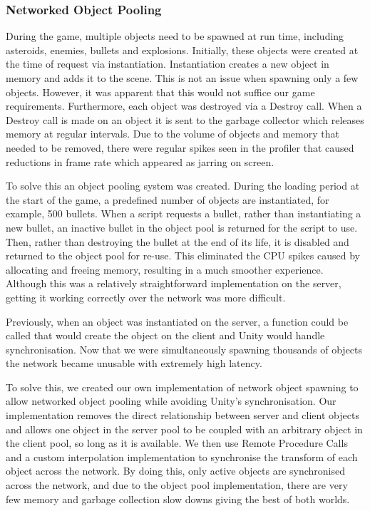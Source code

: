 \documentclass[a4paper,11pt]{article}
\begin{document}
\subsubsection{Networked Object Pooling}
During the game, multiple objects need to be spawned at run time, including asteroids, enemies, bullets and explosions. Initially, these objects were created at the time of request via instantiation. Instantiation creates a new object in memory and adds it to the scene. This is not an issue when spawning only a few objects. However, it was apparent that this would not suffice our game requirements. Furthermore, each object was destroyed via a Destroy call. When a Destroy call is made on an object it is sent to the garbage collector which releases memory at regular intervals. Due to the volume of objects and memory that needed to be removed, there were regular spikes seen in the profiler that caused reductions in frame rate which appeared as jarring on screen.

To solve this an object pooling system was created. During the loading period at the start of the game, a predefined number of objects are instantiated, for example, 500 bullets. When a script requests a bullet, rather than instantiating a new bullet, an inactive bullet in the object pool is returned for the script to use. Then, rather than destroying the bullet at the end of its life, it is disabled and returned to the object pool for re-use. This eliminated the CPU spikes caused by allocating and freeing memory, resulting in a much smoother experience. Although this was a relatively straightforward implementation on the server, getting it working correctly over the network was more difficult. 

Previously, when an object was instantiated on the server, a function could be called that would create the object on the client and Unity would handle synchronisation. Now that we were simultaneously spawning thousands of objects the network became unusable with extremely high latency. 

To solve this, we created our own implementation of network object spawning to allow networked object pooling while avoiding Unity’s synchronisation. Our implementation removes the direct relationship between server and client objects and allows one object in the server pool to be coupled with an arbitrary object in the client pool, so long as it is available. We then use Remote Procedure Calls and a custom interpolation implementation to synchronise the transform of each object across the network. By doing this, only active objects are synchronised across the network, and due to the object pool implementation, there are very few memory and garbage collection slow downs giving the best of both worlds.
\end{document}
